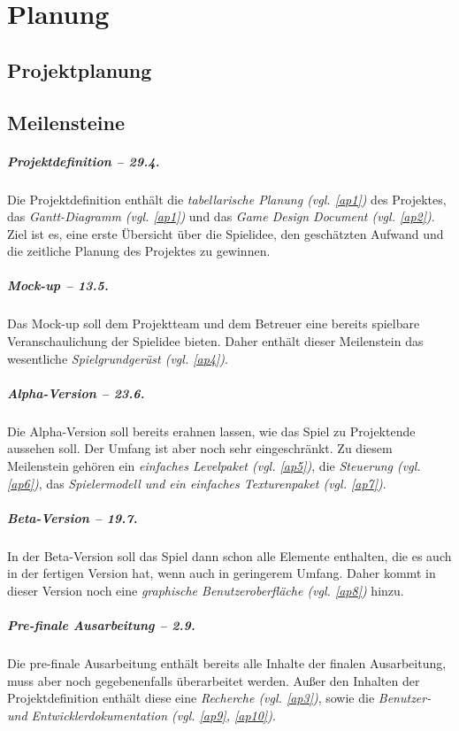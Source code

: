 \chapter{Planung}
\section{Projektplanung}


\section{Meilensteine}
\paragraph{Projektdefinition -- 29.4.}
\noindent
Die Projektdefinition enthält die \textit{tabellarische Planung (vgl. \ref{ap1})} des Projektes, das \textit{Gantt-Diagramm (vgl. \ref{ap1})} und das \textit{Game Design Document (vgl. \ref{ap2})}. Ziel ist es, eine erste Übersicht über die Spielidee, den geschätzten Aufwand und die zeitliche Planung des Projektes zu gewinnen.
\paragraph{Mock-up -- 13.5.}
\noindent
Das Mock-up soll dem Projektteam und dem Betreuer eine bereits spielbare Veranschaulichung der Spielidee bieten. Daher enthält dieser Meilenstein das wesentliche \textit{Spielgrundgerüst (vgl. \ref{ap4})}.
\paragraph{Alpha-Version -- 23.6.}
\noindent
Die Alpha-Version soll bereits erahnen lassen, wie das Spiel zu Projektende aussehen soll. Der Umfang ist aber noch sehr eingeschränkt. Zu diesem Meilenstein gehören ein \textit{einfaches Levelpaket (vgl. \ref{ap5})}, die \textit{Steuerung (vgl. \ref{ap6})}, das \textit{Spielermodell und ein einfaches Texturenpaket (vgl. \ref{ap7})}.
\paragraph{Beta-Version -- 19.7.}
\noindent
In der Beta-Version soll das Spiel dann schon alle Elemente enthalten, die es auch in der fertigen Version hat, wenn auch in geringerem Umfang. Daher kommt in dieser Version noch eine \textit{graphische Benutzeroberfläche (vgl. \ref{ap8})} hinzu.
\paragraph{Pre-finale Ausarbeitung -- 2.9.}
\noindent
Die pre-finale Ausarbeitung enthält bereits alle Inhalte der finalen Ausarbeitung, muss aber noch gegebenenfalls überarbeitet werden. Außer den Inhalten der Projektdefinition enthält diese eine \textit{Recherche (vgl. \ref{ap3})}, sowie die \textit{Benutzer- und Entwicklerdokumentation (vgl. \ref{ap9}, \ref{ap10})}.
